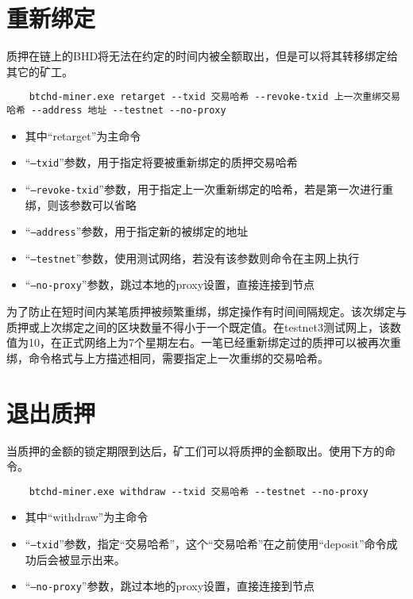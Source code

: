 \section{重新绑定}
\begin{flushleft}
    质押在链上的BHD将无法在约定的时间内被全额取出，但是可以将其转移绑定给其它的矿工。
\end{flushleft}
\scriptsize
\begin{verbatim}
    btchd-miner.exe retarget --txid 交易哈希 --revoke-txid 上一次重绑交易哈希 --address 地址 --testnet --no-proxy
\end{verbatim}
\normalsize
\begin{itemize}
    \item 其中``retarget''为主命令
    \item ``\texttt{--txid}''参数，用于指定将要被重新绑定的质押交易哈希
    \item ``\texttt{--revoke-txid}''参数，用于指定上一次重新绑定的哈希，若是第一次进行重绑，则该参数可以省略
    \item ``\texttt{--address}''参数，用于指定新的被绑定的地址
    \item ``\texttt{--testnet}''参数，使用测试网络，若没有该参数则命令在主网上执行
    \item ``\texttt{--no-proxy}''参数，跳过本地的proxy设置，直接连接到节点
\end{itemize}
\begin{flushleft}
    为了防止在短时间内某笔质押被频繁重绑，绑定操作有时间间隔规定。该次绑定与质押或上次绑定之间的区块数量不得小于一个既定值。在testnet3测试网上，该数值为10，在正式网络上为7个星期左右。一笔已经重新绑定过的质押可以被再次重绑，命令格式与上方描述相同，需要指定上一次重绑的交易哈希。
\end{flushleft}
\section{退出质押}
\begin{flushleft}
    当质押的金额的锁定期限到达后，矿工们可以将质押的金额取出。使用下方的命令。
\end{flushleft}
\scriptsize
\begin{verbatim}
    btchd-miner.exe withdraw --txid 交易哈希 --testnet --no-proxy
\end{verbatim}
\normalsize
\begin{itemize}
    \item 其中``withdraw''为主命令
    \item ``\texttt{--txid}''参数，指定``交易哈希''，这个``交易哈希''在之前使用``deposit''命令成功后会被显示出来。
    \item ``\texttt{--no-proxy}''参数，跳过本地的proxy设置，直接连接到节点
\end{itemize}
